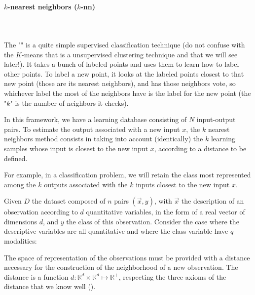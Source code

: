 	
	\paragraph{$k$-nearest neighbors ($k$-nn)}\mbox{}\\\\
	The "" is a quite simple supervised classification technique (do not confuse with the $K$-means that is a unsupervised clustering technique and that we will see later!). It takes a bunch of labeled points and uses them to learn how to label other points.  To label a new point, it looks at the labeled points closest to that new point (those are its nearest neighbors), and has those neighbors vote, so whichever label the most of the neighbors have is the label for the new point (the "$k$" is the number of neighbors it checks).
	
	In this framework, we have a learning database consisting of $N$ input-output pairs. To estimate the output associated with a new input $x$, the $k$ nearest neighbors method consists in taking into account (identically) the $k$ learning samples whose input is closest to the new input $x$, according to a distance to be defined.

For example, in a classification problem, we will retain the class most represented among the $k$ outputs associated with the $k$ inputs closest to the new input $x$.

	Given $D$ the dataset composed of $n$ pairs $(\vec{x}, y)$, with $\vec{x}$ the description of an observation according to $d$ quantitative variables, in the form of a real vector of dimensions $d$, and $y$ the class of this observation. Consider the case where the descriptive variables are all quantitative and where the class variable have $q$ modalities:
	
	The space of representation of the observations must be provided with a distance necessary for the construction of the neighborhood of a new observation. The distance is a function $d:\mathbb{R}^d\times\mathbb{R}^d\mapsto\mathbb{R}^+$, respecting the three axioms of the distance that we know well ().
	
